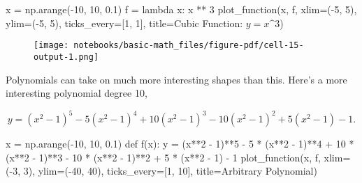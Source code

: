 \documentclass[
  letterpaper,
  DIV=11,
  numbers=noendperiod]{scrreprt}
\newenvironment{Shaded}{\begin{snugshade}}{\end{snugshade}}
\newcommand{\DecValTok}[1]{\textcolor[rgb]{0.68,0.00,0.00}{#1}}
\newcommand{\FloatTok}[1]{\textcolor[rgb]{0.68,0.00,0.00}{#1}}
\newcommand{\KeywordTok}[1]{\textcolor[rgb]{0.00,0.23,0.31}{#1}}
\newcommand{\NormalTok}[1]{\textcolor[rgb]{0.00,0.23,0.31}{#1}}
\newcommand{\OperatorTok}[1]{\textcolor[rgb]{0.37,0.37,0.37}{#1}}
\newcommand{\StringTok}[1]{\textcolor[rgb]{0.13,0.47,0.30}{#1}}
\begin{document}
\begin{Shaded}
\begin{Highlighting}[]
\NormalTok{x }\OperatorTok{=}\NormalTok{ np.arange(}\OperatorTok{{-}}\DecValTok{10}\NormalTok{, }\DecValTok{10}\NormalTok{, }\FloatTok{0.1}\NormalTok{)}
\NormalTok{f }\OperatorTok{=} \KeywordTok{lambda}\NormalTok{ x: x }\OperatorTok{**} \DecValTok{3}
\NormalTok{plot\_function(x, f, xlim}\OperatorTok{=}\NormalTok{(}\OperatorTok{{-}}\DecValTok{5}\NormalTok{, }\DecValTok{5}\NormalTok{), ylim}\OperatorTok{=}\NormalTok{(}\OperatorTok{{-}}\DecValTok{5}\NormalTok{, }\DecValTok{5}\NormalTok{), ticks\_every}\OperatorTok{=}\NormalTok{[}\DecValTok{1}\NormalTok{, }\DecValTok{1}\NormalTok{], }
\NormalTok{              title}\OperatorTok{=}\StringTok{\textquotesingle{}Cubic Function: $y=x\^{}3$\textquotesingle{}}\NormalTok{)}
\end{Highlighting}
\end{Shaded}

\begin{figure}[H]

{\centering \texttt{[image: notebooks/basic-math\_files/figure-pdf/cell-15-output-1.png]}

}

\end{figure}

Polynomials can take on much more interesting shapes than this. Here's a
more interesting polynomial degree 10,

\[y = (x^2 - 1)^5 - 5(x^2 - 1)^4 + 10(x^2 - 1)^3 - 10(x^2 - 1)^2 + 5(x^2 - 1) - 1.\]

\begin{Shaded}
\begin{Highlighting}[]
\NormalTok{x }\OperatorTok{=}\NormalTok{ np.arange(}\OperatorTok{{-}}\DecValTok{10}\NormalTok{, }\DecValTok{10}\NormalTok{, }\FloatTok{0.1}\NormalTok{)}
\KeywordTok{def}\NormalTok{ f(x): }
\NormalTok{    y }\OperatorTok{=}\NormalTok{ (x}\OperatorTok{**}\DecValTok{2} \OperatorTok{{-}} \DecValTok{1}\NormalTok{)}\OperatorTok{**}\DecValTok{5} \OperatorTok{{-}} \DecValTok{5} \OperatorTok{*}\NormalTok{ (x}\OperatorTok{**}\DecValTok{2} \OperatorTok{{-}} \DecValTok{1}\NormalTok{)}\OperatorTok{**}\DecValTok{4} \OperatorTok{+} \DecValTok{10} \OperatorTok{*}\NormalTok{ (x}\OperatorTok{**}\DecValTok{2} \OperatorTok{{-}} \DecValTok{1}\NormalTok{)}\OperatorTok{**}\DecValTok{3} \OperatorTok{{-}} 
    \DecValTok{10} \OperatorTok{*}\NormalTok{ (x}\OperatorTok{**}\DecValTok{2} \OperatorTok{{-}} \DecValTok{1}\NormalTok{)}\OperatorTok{**}\DecValTok{2} \OperatorTok{+} \DecValTok{5} \OperatorTok{*}\NormalTok{ (x}\OperatorTok{**}\DecValTok{2} \OperatorTok{{-}} \DecValTok{1}\NormalTok{) }\OperatorTok{{-}} \DecValTok{1}
\NormalTok{plot\_function(x, f, xlim}\OperatorTok{=}\NormalTok{(}\OperatorTok{{-}}\DecValTok{3}\NormalTok{, }\DecValTok{3}\NormalTok{), ylim}\OperatorTok{=}\NormalTok{(}\OperatorTok{{-}}\DecValTok{40}\NormalTok{, }\DecValTok{40}\NormalTok{), ticks\_every}\OperatorTok{=}\NormalTok{[}\DecValTok{1}\NormalTok{, }\DecValTok{10}\NormalTok{], }
\NormalTok{              title}\OperatorTok{=}\StringTok{\textquotesingle{}Arbitrary Polynomial\textquotesingle{}}\NormalTok{)}
\end{Highlighting}
\end{Shaded}
\end{document}
